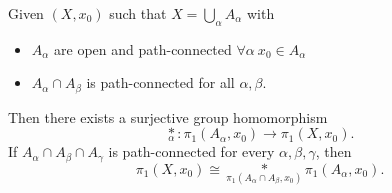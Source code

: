 \begin{theorem}\label{thm:Seifert-Van-Kampen-Theorem}
	Given \((X, x_0)\) such that \(X = \bigcup\limits_{\alpha } A_{\alpha }\) with
	\begin{itemize}
		\item \(A_{\alpha }\) are open and path-connected \(\forall \alpha \ x_0\in A_{\alpha }\)
		\item \(A_{\alpha }\cap A_{\beta }\) is path-connected for all \(\alpha, \beta  \).
	\end{itemize}
	Then there exists a surjective group homomorphism
	\[
		\underset{\alpha }{*}\colon \pi _1(A_{\alpha }, x_0)\to \pi _1(X, x_0).
	\]
	If \(A_{\alpha }\cap A_{\beta}\cap A_{\gamma}\) is path-connected for every \(\alpha , \beta , \gamma\), then
	\[
		\pi _1(X, x_0)\cong \underset{\pi _1(A_{\alpha }\cap A_{\beta }, x_0)}{*}\pi _1(A_{\alpha }, x_0).
	\]
	\begin{figure}[H]
		\centering
		\label{fig:thm:Seifert-Van-Kampen-Theorem}
	\end{figure}
\end{theorem}

\begin{eg}

\end{eg}